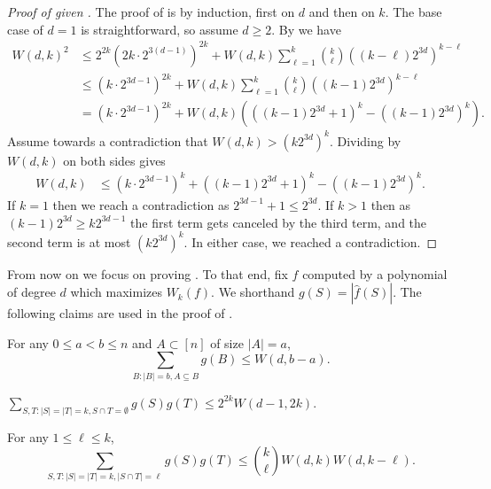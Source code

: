 \documentclass{toc}
\begin{document}
\begin{proof}[Proof of  given ]
The proof of  is by induction, first on $d$ and then on $k$. The base case of $d=1$ is straightforward, so assume $d \ge 2$. By  we have
\begin{align*}
W(d,k)^2 &\le 2^{2k} \left( 2k \cdot 2^{3(d-1)} \right)^{2k}+W(d,k)
\sum_{\ell=1}^k \binom{k}{\ell} \left((k-\ell) 2^{3d} \right)^{k-\ell} \\
& \le
\left( k \cdot 2^{3d-1} \right)^{2k} + W(d,k) \sum_{\ell=1}^k \binom{k}{\ell} \left((k-1) 2^{3d} \right)^{k-\ell} \\
& = \left( k \cdot 2^{3d-1} \right)^{2k} + W(d,k) \left(\left((k-1) 2^{3d}+1\right)^k - \left((k-1) 2^{3d}\right)^k \right).
\end{align*}
Assume towards a contradiction that $W(d,k)>(k 2^{3d})^k$. Dividing by $W(d,k)$ on both sides gives
\begin{align*}
W(d,k) & \le \left( k \cdot 2^{3d-1} \right)^{k} + \left((k-1) 2^{3d}+1\right)^k - \left((k-1) 2^{3d}\right)^k.
\end{align*}
If $k=1$ then we reach a contradiction as $2^{3d-1}+1 \le 2^{3d}$. If $k>1$ then as $(k-1) 2^{3d} \ge k 2^{3d-1}$
the first term gets canceled by the third term, and the second term is
at most $(k 2^{3d})^k$. In either case, we reached a contradiction.
\end{proof}

{}From now on we focus on proving .
To that end, fix $f$ computed by a polynomial
of degree $d$ which maximizes $W_k(f)$. We shorthand $g(S) = |\hat{f}(S)|$.
The following claims are used in the proof of .
\begin{claim}
\label{claim:fourier_level_down}
For any $0\le a < b \le n$ and $A \subset [n]$ of size $|A| = a$,
$$\sum_{B: |B|=b, A \subseteq B} g(B) \le W(d,b -a).$$
\end{claim}
\begin{claim}
\label{claim:derivative}
$\displaystyle \sum_{S,T: |S|=|T|=k, S \cap T = \emptyset} g(S)g(T) \le 2^{2k} W(d-1,2k)$.
\end{claim}
\begin{claim}
\label{claim:sublevels} For any $1 \le \ell \le k$, $$ \sum_{S,T: |S|=|T|=k, |S \cap T| = \ell} g(S) g(T) \le \binom{k}{\ell} W(d,k)W(d,k-\ell). $$
\end{claim}
\end{document}
